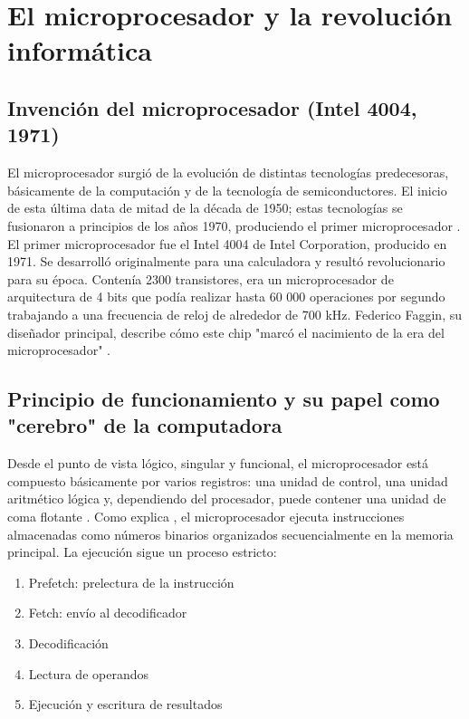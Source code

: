\documentclass[]{article}
\begin{document}
\section{El microprocesador y la revolución informática}
\subsection{Invención del microprocesador (Intel 4004, 1971)}
El microprocesador surgió de la evolución de distintas tecnologías predecesoras, básicamente de la computación y de la tecnología de semiconductores. El inicio de esta última data de mitad de la década de 1950; estas tecnologías se fusionaron a principios de los años 1970, produciendo el primer microprocesador \cite{rodriguez2007}. 
El primer microprocesador fue el Intel 4004 \cite{faggin1996} de Intel Corporation, producido en 1971. Se desarrolló originalmente para una calculadora y resultó revolucionario para su época. Contenía 2300 transistores, era un microprocesador de arquitectura de 4 bits que podía realizar hasta 60 000 operaciones por segundo trabajando a una frecuencia de reloj de alrededor de 700 kHz. Federico Faggin, su diseñador principal, describe cómo este chip "marcó el nacimiento de la era del microprocesador" \cite{faggin1996}.

\subsection{Principio de funcionamiento y su papel como "cerebro" de la computadora}
Desde el punto de vista lógico, singular y funcional, el microprocesador está compuesto básicamente por varios registros: una unidad de control, una unidad aritmético lógica y, dependiendo del procesador, puede contener una unidad de coma flotante \cite{pardo2019}.
Como explica \cite{rodriguez2007}, el microprocesador ejecuta instrucciones almacenadas como números binarios organizados secuencialmente en la memoria principal. La ejecución sigue un proceso estricto:
\begin{enumerate}
    \item Prefetch: prelectura de la instrucción
    \item Fetch: envío al decodificador
    \item Decodificación
    \item Lectura de operandos
    \item Ejecución y escritura de resultados
\end{enumerate}
\end{document}
